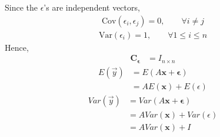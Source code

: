\documentclass[journal,12pt,onecolumn]{IEEEtran}
\providecommand{\mtx}[1]{\mathbf{#1}}
\theoremstyle{remark}
\begin{document}
Since the ${\epsilon}$'s are independent vectors, 
\begin{align}
\textrm{Cov}({\epsilon}_i,{\epsilon}_j)=0 , \qquad \forall i\neq j
\end{align}
\begin{align}
\textrm{Var}({\epsilon}_i)=1 , \qquad \forall 1\leq i\leq n
\end{align}
Hence, 
\begin{align}
 \mathbf{C_{\epsilon}}&=I_{n\times n}
\end{align}
\begin{align}
E(\vec{y})&=E(A\mtx{\boldsymbol{x}}+\mtx{\epsilon})\\
&=AE(\boldsymbol{x})+E({\epsilon})
\end{align}
\begin{align}
Var(\vec{y})&=Var(A\mtx{\boldsymbol{x}}+\mtx{\epsilon})\\
&=AVar(\boldsymbol{x})+Var({\epsilon})\\
&=AVar(\boldsymbol{x})+I
\end{align}
\end{document}
